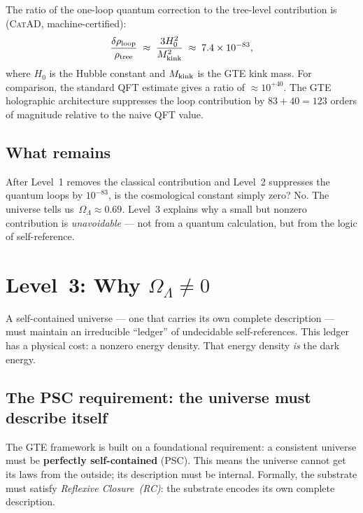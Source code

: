 \documentclass[11pt,a4paper]{article}
\newcommand{\term}[1]{\textbf{#1}}
\newcommand{\OmL}{\Omega_\Lambda}
\newcommand{\CatAD}{\textsc{CatAD}}
\begin{document}
The ratio of the one-loop quantum correction to the tree-level contribution is
(\CatAD, machine-certified):
\[
  \frac{\delta\rho_{\rm loop}}{\rho_{\rm tree}}
  \;\approx\; \frac{3H_0^2}{M_{\rm kink}^2}
  \;\approx\; 7.4 \times 10^{-83},
\]
where $H_0$ is the Hubble constant and $M_{\rm kink}$ is the GTE kink mass.
For comparison, the standard QFT estimate gives a ratio of $\approx 10^{+40}$.
The GTE holographic architecture suppresses the loop contribution by
$83 + 40 = 123$ orders of magnitude relative to the naive QFT value.

\subsection{What remains}

After Level~1 removes the classical contribution and Level~2 suppresses the
quantum loops by $10^{-83}$, is the cosmological constant simply zero?  No.
The universe tells us~$\OmL \approx 0.69$.  Level~3 explains why a small but
nonzero contribution is \emph{unavoidable} --- not from a quantum calculation,
but from the logic of self-reference.

\section{Level~3: Why \texorpdfstring{$\Omega_\Lambda \neq 0$}{Omega\_Lambda ≠ 0}}
\label{sec:level3}

\begin{tcolorbox}[colback=boxorange,colframe=orange!60!black,
  title={Key idea}]
A self-contained universe --- one that carries its own complete description
--- must maintain an irreducible ``ledger'' of undecidable self-references.
This ledger has a physical cost: a nonzero energy density.
That energy density \emph{is} the dark energy.
\end{tcolorbox}

\subsection{The PSC requirement: the universe must describe itself}

The GTE framework is built on a foundational requirement: a consistent universe
must be \term{perfectly self-contained} (PSC).  This means the universe cannot
get its laws from the outside; its description must be internal.  Formally, the
substrate must satisfy \emph{Reflexive Closure~(RC)}: the substrate encodes its
own complete description.
\end{document}
